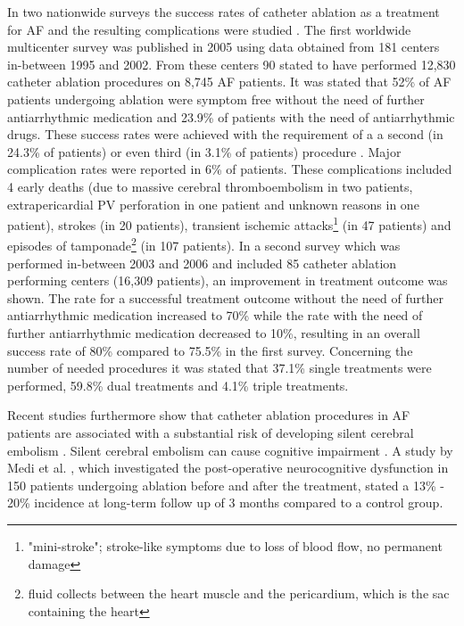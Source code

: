 In two nationwide surveys the success rates of catheter ablation as a treatment for AF and the resulting complications were studied \cite{Cap05, Cap10}. 
The first worldwide multicenter survey was published in 2005 using data obtained from 181 centers in-between 1995 and 2002. 
From these centers 90 stated to have performed 12,830 catheter ablation procedures on 8,745 AF patients. 
It was stated that 52\% of AF patients undergoing ablation were symptom free without the need of further antiarrhythmic medication and 23.9\% 
of patients with the need of antiarrhythmic drugs. These success rates were achieved with the requirement of a 
a second (in 24.3\% of patients) or even third (in 3.1\% of patients) procedure \cite{Cap05}. Major complication rates were reported in 
6\% of patients. These complications included 4 early deaths (due to massive cerebral thromboembolism in two patients, extrapericardial PV 
perforation in one patient and unknown reasons in one patient), strokes (in 20 patients), transient ischemic attacks\footnote{"mini-stroke"; stroke-like symptoms due to loss of blood flow, no permanent damage} 
(in 47 patients) and episodes of tamponade\footnote{fluid collects between the heart muscle and the pericardium, which is the sac containing 
the heart} (in 107 patients). 
In a second survey which was performed in-between 2003 and 2006 \cite{Cap10} and included 85 catheter ablation 
performing centers (16,309 patients), an improvement in treatment outcome was shown. 
The rate for a successful treatment outcome without the need of further antiarrhythmic medication increased to 
70\% while the rate with the need of further antiarrhythmic medication decreased to 10\%, resulting in an overall success rate of 80\% 
compared to 75.5\% in the first survey. Concerning the number of needed procedures it was stated that 37.1\% single treatments were performed, 
59.8\% dual treatments and 4.1\% triple treatments.\newline

Recent studies furthermore show that catheter ablation procedures in AF patients are associated with a 
substantial risk of developing silent cerebral embolism \cite{Her13, Gai10, Marti13, Med13, Schr10, Lic06}. 
Silent cerebral embolism can cause cognitive impairment \cite{Kne08}. A study by Medi et al. \cite{Med13}, which investigated the 
post-operative neurocognitive dysfunction in 150 patients undergoing ablation before and after the treatment, stated a 13\% - 20\% incidence 
at long-term follow up of 3 months compared to a control group. \newline


